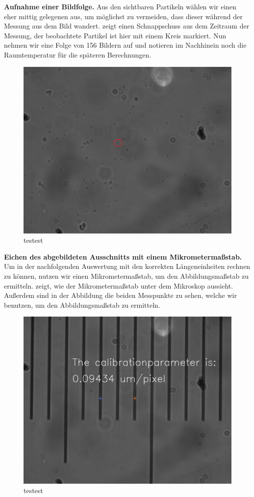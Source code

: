 \textbf{Aufnahme einer Bildfolge.} Aus den sichtbaren Partikeln wählen wir einen eher mittig gelegenen aus, um möglichst zu vermeiden, dass dieser während der Messung aus dem Bild wandert.  zeigt einen Schnappschuss aus dem Zeitraum der Messung, der beobachtete Partikel ist hier mit einem Kreis markiert. Nun nehmen wir eine Folge von 156 Bildern auf und notieren im Nachhinein noch die Raumtemperatur für die späteren Berechnungen.

\begin{figure}[H]
  \centering
  \includegraphics[width=.66\textwidth]{files/Bild105.png}
  \caption{testest}
  \label{fig:bild105}
\end{figure}

\textbf{Eichen des abgebildeten Ausschnitts mit einem Mikrometermaßstab.} Um in der nachfolgenden Auswertung mit den korrekten Längeneinheiten rechnen zu können, nutzen wir einen Mikrometermaßstab, um den Abbildungsmaßstab zu ermitteln.  zeigt, wie der Mikrometermaßstab unter dem Mikroskop aussieht. Außerdem sind in der Abbildung die beiden Messpunkte zu sehen, welche wir benutzen, um den Abbildungsmaßstab zu ermitteln.

\begin{figure}[H]
  \centering
  \includegraphics[width=.66\textwidth]{files/Calibration.png}
  \caption{testest}
  \label{fig:calibration}
\end{figure}
